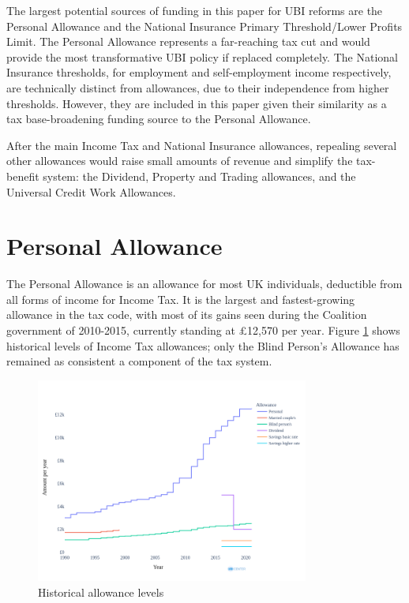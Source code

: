 \documentclass{article}
\begin{document}
    The largest potential sources of funding in this paper for UBI reforms are the Personal Allowance and the National Insurance Primary Threshold/Lower Profits Limit. The Personal Allowance represents a far-reaching tax cut and would provide the most transformative UBI policy if replaced completely. The National Insurance thresholds, for employment and self-employment income respectively, are technically distinct from allowances, due to their independence from higher thresholds. However, they are included in this paper given their similarity as a tax base-broadening funding source to the Personal Allowance. 
    
    After the main Income Tax and National Insurance allowances, repealing several other allowances would raise small amounts of revenue and simplify the tax-benefit system: the Dividend, Property and Trading allowances, and the Universal Credit Work Allowances.
    \section{Personal Allowance}
    The Personal Allowance is an allowance for most UK individuals, deductible from all forms of income for Income Tax. It is the largest and fastest-growing allowance in the tax code, with most of its gains seen during the Coalition government of 2010-2015, currently standing at £12,570 per year. Figure \ref{fig:PA_hist} shows historical levels of Income Tax allowances; only the Blind Person's Allowance has remained as consistent a component of the tax system.
    \begin{figure}
        \centering
        \includegraphics[width=0.8\textwidth]{images/fig_1.png}
        \caption{Historical allowance levels}
        \label{fig:PA_hist}
    \end{figure}
\end{document}
